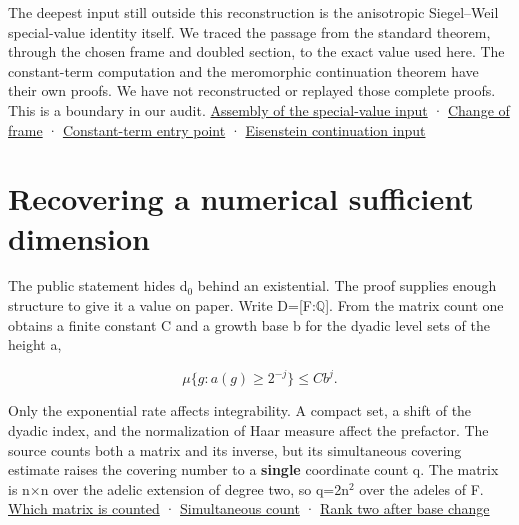 \documentclass[11pt,letterpaper]{article}
\begin{document}
The deepest input still outside this reconstruction is the anisotropic Siegel–Weil special-value identity itself. We traced the passage from the standard theorem, through the chosen frame and doubled section, to the exact value used here. The constant-term computation and the meromorphic continuation theorem have their own proofs. We have not reconstructed or replayed those complete proofs. This is a boundary in our audit. \href{https://github.com/nousentllc/riemann-hypothesis/blob/40e56bab026552e089d7afcfeff08d2defb9c005/src/Development/AutomorphicArithmetic/Foundations/GaloisRepresentations/ThetaParseval/ThetaKernels/ThkBaseNormZeta.lean\#L17-L23}{Assembly of the special-value input} · \href{https://github.com/nousentllc/riemann-hypothesis/blob/40e56bab026552e089d7afcfeff08d2defb9c005/src/Development/AutomorphicArithmetic/Foundations/GaloisRepresentations/ThetaParseval/ThetaKernels/ThkBaseSWStd.lean\#L62-L75}{Change of frame} · \href{https://github.com/nousentllc/riemann-hypothesis/blob/40e56bab026552e089d7afcfeff08d2defb9c005/src/Development/AutomorphicArithmetic/Foundations/GaloisRepresentations/ThetaParseval/ThetaKernels/SiegelWeilFinFinal.lean\#L15}{Constant-term entry point} · \href{https://github.com/nousentllc/riemann-hypothesis/blob/40e56bab026552e089d7afcfeff08d2defb9c005/src/Development/AutomorphicArithmetic/Foundations/GaloisRepresentations/ThetaParseval/ThetaKernels/SiegelMultOfK.lean\#L18-L30}{Eisenstein continuation input}

\section{Recovering a numerical sufficient dimension}
The public statement hides d\ensuremath{{}_{0}} behind an existential. The proof supplies enough structure to give it a value on paper. Write D=[F:\ensuremath{\mathbb{Q}}]. From the matrix count one obtains a finite constant C and a growth base b for the dyadic level sets of the height a,

\[\mu\{g:a(g)\geq 2^{-j}\}\leq Cb^j.\]

Only the exponential rate affects integrability. A compact set, a shift of the dyadic index, and the normalization of Haar measure affect the prefactor. The source counts both a matrix and its inverse, but its simultaneous covering estimate raises the covering number to a \textbf{single} coordinate count q. The matrix is n\ensuremath{\times}n over the adelic extension of degree two, so q=2n\ensuremath{{}^{2}} over the adeles of F. \href{https://github.com/nousentllc/riemann-hypothesis/blob/40e56bab026552e089d7afcfeff08d2defb9c005/src/Development/AutomorphicArithmetic/Foundations/GaloisRepresentations/ThetaParseval/ThetaKernels/ThkBaseHgtInt.lean\#L32-L47}{Which matrix is counted} · \href{https://github.com/nousentllc/riemann-hypothesis/blob/40e56bab026552e089d7afcfeff08d2defb9c005/src/Development/WeilBound/ThetaLifts/LatticeBasics/HgtCount.lean\#L77-L82}{Simultaneous count} · \href{https://github.com/nousentllc/riemann-hypothesis/blob/40e56bab026552e089d7afcfeff08d2defb9c005/src/Development/AutomorphicArithmetic/Foundations/GaloisRepresentations/ThetaParseval/ThetaKernels/SiegelWeilAstepCLawB.lean\#L20-L24}{Rank two after base change}
\end{document}
